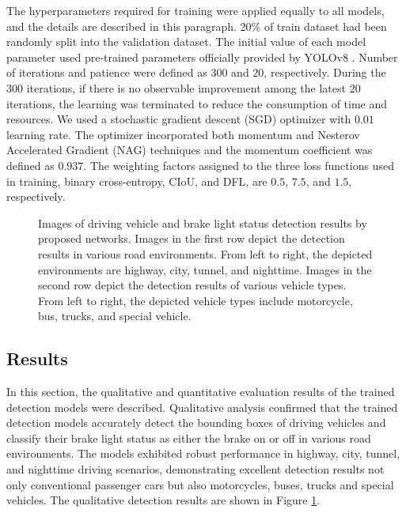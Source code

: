 The hyperparameters required for training were applied equally to all models, and the details are described in this paragraph.
20\% of train dataset had been randomly split into the validation dataset.
The initial value of each model parameter used pre-trained parameters officially provided by YOLOv8 \cite{YOLOv8}.
Number of iterations and patience were defined as $300$ and $20$, respectively.
During the 300 iterations, if there is no observable improvement among the latest 20 iterations, the learning was terminated to reduce the consumption of time and resources.
We used a stochastic gradient descent (SGD) optimizer with $0.01$ learning rate.
The optimizer incorporated both momentum and Nesterov Accelerated Gradient (NAG) techniques \cite{sutskever2013importance} and the momentum coefficient was defined as $0.937$.
The weighting factors assigned to the three loss functions used in training, binary cross-entropy, CIoU, and DFL, are $0.5$, $7.5$, and $1.5$, respectively.


\begin{figure}[t]%

    \hfill

\caption{Images of driving vehicle and brake light status detection results by proposed networks. Images in the first row depict the detection results in various road environments. From left to right, the depicted environments are highway, city, tunnel, and nighttime. Images in the second row depict the detection results of various vehicle types. From left to right, the depicted vehicle types include motorcycle, bus, trucks, and special vehicle.}
\label{fig:detection}%
\end{figure}




\subsection{Results}
\label{sec:exp_results}
In this section, the qualitative and quantitative evaluation results of the trained detection models were described.
Qualitative analysis confirmed that the trained detection models accurately detect the bounding boxes of driving vehicles and classify their brake light status as either the brake on or off in various road environments. 
The models exhibited robust performance in highway, city, tunnel, and nighttime driving scenarios, demonstrating excellent detection results not only conventional passenger cars but also motorcycles, buses, trucks and special vehicles.
The qualitative detection results are shown in Figure \ref{fig:detection}.


